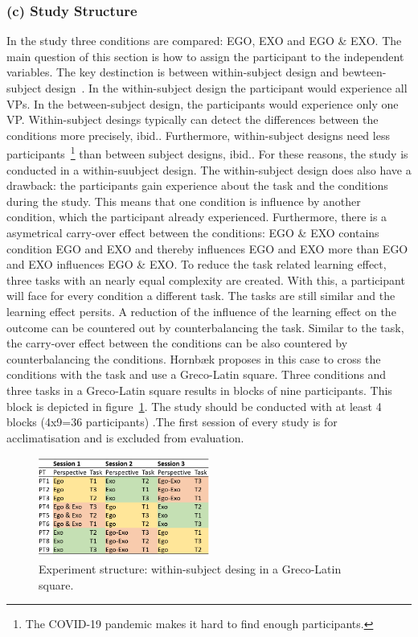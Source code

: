 \subsubsection{(c) Study Structure}
In the study three conditions are compared: EGO, EXO and EGO \& EXO. The main question of this section is how to assign the participant to the independent variables. The key destinction is between within-subject design and bewteen-subject design~\cite{hornbaek}. In the within-subject design the participant would experience all VPs. In the between-subject design, the participants would experience only one VP. Within-subject desings typically can detect the differences between the conditions more precisely, ibid.. Furthermore, within-subject designs need less participants~\footnote{The COVID-19 pandemic makes it hard to find enough participants.} than between subject designs, ibid.. For these reasons, the study is conducted in a within-suubject design. The within-subject design does also have a drawback: the participants gain experience about the task and the conditions during the study. This means that one condition is influence by another condition, which the participant already experienced. Furthermore, there is a asymetrical carry-over effect between the conditions: EGO \& EXO contains condition EGO and EXO and thereby influences EGO and EXO more than EGO and EXO influences EGO \& EXO. To reduce the task related learning effect, three tasks with an nearly equal complexity are created. With this, a participant will face for every condition a different task. The tasks are still similar and the learning effect persits. A reduction of the influence of the learning effect on the outcome can be countered out by counterbalancing the task. Similar to the task, the carry-over effect between the conditions can be also countered by counterbalancing the conditions. Hornb\ae{}k proposes in this case to cross the conditions with the task and use a Greco-Latin square. Three conditions and three tasks in a Greco-Latin square results in blocks of nine participants. This block is depicted in figure~\ref{fig:study_session_plan}. The study should be conducted with at least 4 blocks (4x9=36 participants) .The first session of every study is for acclimatisation and is excluded from evaluation.

\begin{figure}[htb]
	\centering
	\includegraphics[width=0.5\textwidth]{figures/study_session_plan.png}
	\caption[Study structure]{Experiment structure: within-subject desing in a Greco-Latin square.}
	\label{fig:study_session_plan}
\end{figure}

